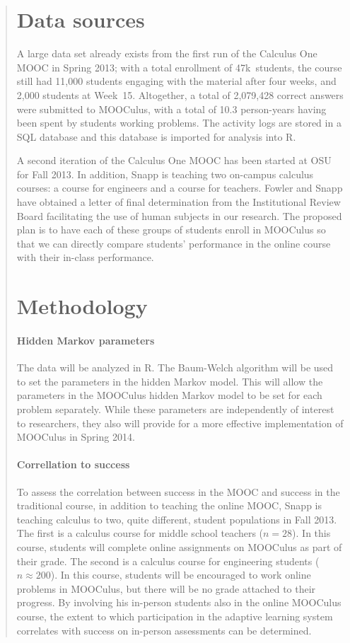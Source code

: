 \documentclass[12pt]{article}
\begin{document}
\begin{quote}
\section{Data sources}

A large data set already exists from the first run of the Calculus One
MOOC in Spring 2013; with a total enrollment of 47k~students, the
course still had 11,000 students engaging with the material after four
weeks, and 2,000 students at Week~15.  Altogether, a total of
2,079,428 correct answers were submitted to MOOCulus, with a total of
10.3 person-years having been spent by students working problems.  The
activity logs are stored in a SQL database and this database is
imported for analysis into R.

A second iteration of the Calculus One MOOC has been started at OSU
for Fall 2013.  In addition, Snapp is teaching two on-campus calculus
courses: a course for engineers and a course for teachers.  Fowler and
Snapp have obtained a letter of final determination from the
Institutional Review Board facilitating the use of human subjects in
our research.  The proposed plan is to have each of these groups of
students enroll in MOOCulus so that we can directly compare students'
performance in the online course with their in-class performance.


\section{Methodology}

\paragraph{Hidden Markov parameters}

The data will be analyzed in R. The Baum-Welch algorithm will be used
to set the parameters in the hidden Markov model. This will allow the
parameters in the MOOCulus hidden Markov model to be set for each
problem separately. While these parameters are independently of
interest to researchers, they also will provide for a more effective
implementation of MOOCulus in Spring 2014.

\paragraph{Correllation to success}

To assess the correlation between success in the MOOC and success in
the traditional course, in addition to teaching the online MOOC, Snapp
is teaching calculus to two, quite different, student populations in
Fall 2013.  The first is a calculus course for middle school teachers
($n=28$). In this course, students will complete online assignments on
MOOCulus as part of their grade.  The second is a calculus course for
engineering students ($n\approx 200$).  In this course, students will
be encouraged to work online problems in MOOCulus, but there will be
no grade attached to their progress.  By involving his in-person
students also in the online MOOCulus course, the extent to which
participation in the adaptive learning system correlates with success
on in-person assessments can be determined.





\end{quote}
\end{document}
